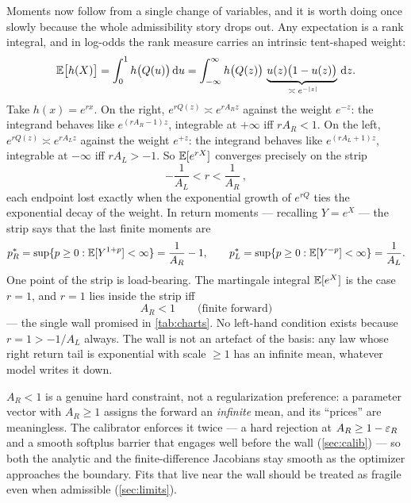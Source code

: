 \documentclass[11pt]{article}
\begin{document}
Moments now follow from a single change of variables, and it is worth doing
once slowly because the whole admissibility story drops out.  Any
expectation is a rank integral, and in log-odds the rank measure carries an
intrinsic tent-shaped weight:
\begin{equation}
\mathbb{E}\big[h(X)\big]
=\int_0^1 h\big(Q(u)\big)\,\mathrm{d} u
=\int_{-\infty}^{\infty}h\big(Q(z)\big)\,
\underbrace{u(z)\big(1-u(z)\big)}_{\;\asymp\;e^{-|z|}}\,\mathrm{d} z .
\label{eq:rank_integral}
\end{equation}
Take $h(x)=e^{rx}$.  On the right, $e^{rQ(z)}\asymp e^{rA_Rz}$ against the
weight $e^{-z}$: the integrand behaves like $e^{(rA_R-1)z}$, integrable at
$+\infty$ iff $rA_R<1$.  On the left, $e^{rQ(z)}\asymp e^{rA_Lz}$ against
the weight $e^{+z}$: the integrand behaves like $e^{(rA_L+1)z}$, integrable
at $-\infty$ iff $rA_L>-1$.  So $\mathbb{E}[e^{rX}]$ converges precisely on the
strip
\begin{equation}
-\frac{1}{A_L}<r<\frac{1}{A_R}\,,
\end{equation}
each endpoint lost exactly when the exponential growth of $e^{rQ}$ ties the
exponential decay of the weight.  In return moments --- recalling
$Y=e^{X}$ --- the strip says that the last finite moments are
\begin{equation}
p_R^{*}=\sup\{p\ge0:\mathbb{E}[Y^{1+p}]<\infty\}=\frac{1}{A_R}-1,
\qquad
p_L^{*}=\sup\{p\ge0:\mathbb{E}[Y^{-p}]<\infty\}=\frac{1}{A_L}.
\label{eq:critical}
\end{equation}
One point of the strip is load-bearing.  The martingale integral
$\mathbb{E}[e^{X}]$ is the case $r=1$, and $r=1$ lies inside the strip iff
\begin{equation}
A_R<1
\qquad\text{(finite forward)}
\label{eq:AR_wall}
\end{equation}
--- the single wall promised in \cref{tab:charts}.  No left-hand condition
exists because $r=1>-1/A_L$ always.  The wall is not an artefact of the
basis: any law whose right return tail is exponential with scale $\ge1$ has
an infinite mean, whatever model writes it down.

\begin{caution}
$A_R<1$ is a genuine hard constraint, not a regularization preference: a
parameter vector with $A_R\ge1$ assigns the forward an \emph{infinite} mean,
and its ``prices'' are meaningless.  The calibrator enforces it twice ---
a hard rejection at $A_R\ge1-\varepsilon_R$ and a smooth softplus barrier that
engages well before the wall (\cref{sec:calib}) --- so both the analytic and
the finite-difference Jacobians stay smooth as the optimizer approaches the
boundary.  Fits that live near the wall should be treated as fragile even
when admissible (\cref{sec:limits}).
\end{caution}
\end{document}
